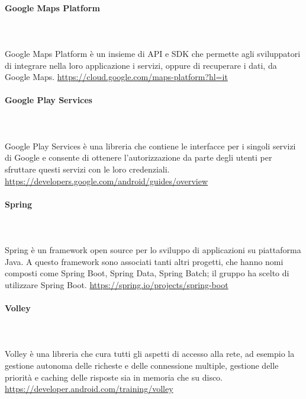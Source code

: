 \paragraph{Google Maps Platform}\mbox{}\\ \\
Google Maps Platform è un insieme di API e SDK che permette agli sviluppatori di integrare nella loro applicazione i servizi, oppure di recuperare i dati, da Google Maps.
\href{https://cloud.google.com/maps-platform?hl=it}{https://cloud.google.com/maps-platform?hl=it}

\paragraph{Google Play Services}\mbox{}\\ \\
Google Play Services è una libreria che contiene le interfacce per i singoli servizi di Google e consente di ottenere l'autorizzazione da parte degli utenti per sfruttare questi servizi con le loro credenziali.
\href{https://developers.google.com/android/guides/overview}{https://developers.google.com/android/guides/overview}

\paragraph{Spring}\mbox{}\\ \\
Spring è un framework open source per lo sviluppo di applicazioni su piattaforma Java.
A questo framework sono associati tanti altri progetti, che hanno nomi composti come Spring Boot, Spring Data, Spring Batch; il gruppo ha scelto di utilizzare Spring Boot.
\href{https://spring.io/projects/spring-boot}{https://spring.io/projects/spring-boot}


\paragraph{Volley}\mbox{}\\ \\
Volley è una libreria che cura tutti gli aspetti di accesso alla rete, ad esempio la gestione autonoma delle richeste e delle connessione multiple, gestione delle priorità e caching delle risposte sia in memoria che su disco.
\href{https://developer.android.com/training/volley}{https://developer.android.com/training/volley}